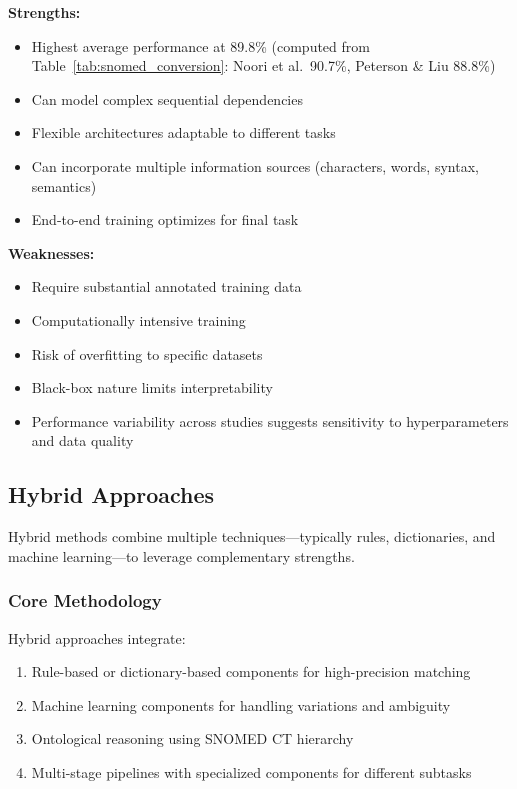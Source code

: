 \textbf{Strengths:}
\begin{itemize}
    \item Highest average performance at 89.8\% (computed from Table~\ref{tab:snomed_conversion}: Noori et al.\ 90.7\%, Peterson \& Liu 88.8\%)
    \item Can model complex sequential dependencies
    \item Flexible architectures adaptable to different tasks
    \item Can incorporate multiple information sources (characters, words, syntax, semantics)
    \item End-to-end training optimizes for final task
\end{itemize}

\textbf{Weaknesses:}
\begin{itemize}
    \item Require substantial annotated training data
    \item Computationally intensive training
    \item Risk of overfitting to specific datasets
    \item Black-box nature limits interpretability
    \item Performance variability across studies suggests sensitivity to hyperparameters and data quality
\end{itemize}

\subsection{Hybrid Approaches}

Hybrid methods combine multiple techniques—typically rules, dictionaries, and machine learning—to leverage complementary strengths.

\subsubsection{Core Methodology}

Hybrid approaches integrate:
\begin{enumerate}
    \item Rule-based or dictionary-based components for high-precision matching
    \item Machine learning components for handling variations and ambiguity
    \item Ontological reasoning using SNOMED CT hierarchy
    \item Multi-stage pipelines with specialized components for different subtasks
\end{enumerate}


